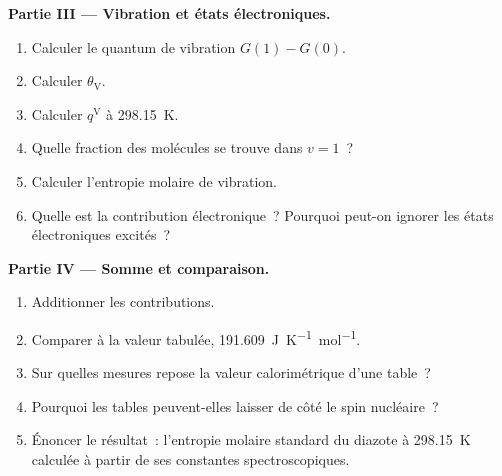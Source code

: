\begin{problem}
\medskip\noindent\textbf{Partie III --- Vibration et états électroniques.}
\begin{enumerate}[resume]
  \item Calculer le quantum de vibration $G(1) - G(0)$.
  \item Calculer $\theta_{\mathrm V}$.
  \item Calculer $q^{\mathrm V}$ à \qty{298.15}{K}.
  \item Quelle fraction des molécules se trouve dans $v = 1$~?
  \item Calculer l'entropie molaire de vibration.
  \item Quelle est la contribution électronique~? Pourquoi peut-on
        ignorer les états électroniques excités~?
\end{enumerate}

\medskip\noindent\textbf{Partie IV --- Somme et comparaison.}
\begin{enumerate}[resume]
  \item Additionner les contributions.
  \item Comparer à la valeur tabulée, \qty{191.609}{J.K^{-1}.mol^{-1}}.
  \item Sur quelles mesures repose la valeur calorimétrique d'une
        table~?
  \item Pourquoi les tables peuvent-elles laisser de côté le spin
        nucléaire~?
  \item Énoncer le résultat~: l'entropie molaire standard du diazote à
        \qty{298.15}{K} calculée à partir de ses constantes
        spectroscopiques.
\end{enumerate}
\end{problem}
